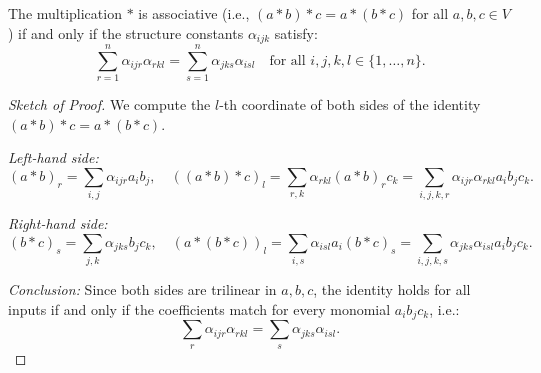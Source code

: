 \documentclass[10pt,a4paper]{amsart}
\begin{document}
\begin{proposition}
The multiplication \( * \) is associative (i.e., \( (a * b) * c = a * (b * c) \) for all \( a, b, c \in V \)) if and only if the structure constants \( \alpha_{ijk} \) satisfy:
\[
\sum_{r=1}^n \alpha_{ijr} \alpha_{rkl} = \sum_{s=1}^n \alpha_{jks} \alpha_{isl}
\quad \text{for all } i, j, k, l \in \{1, \dots, n\}.
\]
\end{proposition}

\begin{proof}[Sketch of Proof]
We compute the \(l\)-th coordinate of both sides of the identity \((a * b) * c = a * (b * c)\).

\medskip
\noindent\textit{Left-hand side:}
\[
(a * b)_r = \sum_{i,j} \alpha_{ijr} a_i b_j,\quad
((a * b) * c)_l = \sum_{r,k} \alpha_{rkl} (a * b)_r c_k = \sum_{i,j,k,r} \alpha_{ijr} \alpha_{rkl} a_i b_j c_k.
\]

\medskip
\noindent\textit{Right-hand side:}
\[
(b * c)_s = \sum_{j,k} \alpha_{jks} b_j c_k,\quad
(a * (b * c))_l = \sum_{i,s} \alpha_{isl} a_i (b * c)_s = \sum_{i,j,k,s} \alpha_{jks} \alpha_{isl} a_i b_j c_k.
\]

\medskip
\noindent\textit{Conclusion:}
Since both sides are trilinear in \(a, b, c\), the identity holds for all inputs if and only if the coefficients match for every monomial \(a_i b_j c_k\), i.e.:
\[
\sum_{r} \alpha_{ijr} \alpha_{rkl} = \sum_{s} \alpha_{jks} \alpha_{isl}.
\]
\end{proof}
\end{document}
